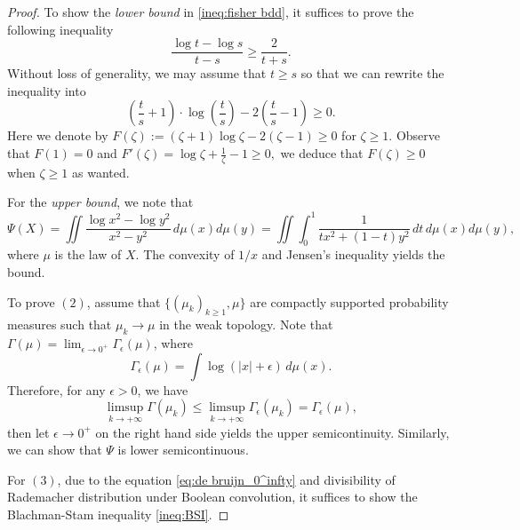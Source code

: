 \documentclass[10pt, reqno]{amsart}
\numberwithin{equation}{section}
\theoremstyle{definition}
\theoremstyle{plain}
\theoremstyle{remark}
\newcommand{\1}{\mathbbm{1}}
\begin{document}
	\begin{proof}
 To show the \emph{lower bound} in \eqref{ineq:fisher bdd}, it suffices to prove the following inequality
		\begin{equation}\label{ineq:lower bound}
			\frac{\log t-\log s}{t-s}\geq \frac{2}{t+s}.
		\end{equation}
	Without loss of generality, we may assume that $t\geq s$ so that we can rewrite the inequality into
        \begin{equation*}
			\left( \frac{t}{s}+1 \right)\cdot \log \left( \frac{t}{s} \right)- 2\left( \frac{t}{s}-1 \right)\geq 0.
		\end{equation*}
		Here we denote by $F(\zeta):=(\zeta+1)\log \zeta-2(\zeta-1)\geq 0$ for $\zeta\geq 1.$ Observe that $F(1)=0$ and $F'(\zeta)=\log \zeta+ \frac{1}{\zeta}-1\geq 0,$ we deduce that $F(\zeta)\geq 0$ when $\zeta\geq 1$ as wanted.
        
 For the \emph{upper bound}, we note that
		\begin{equation}\label{eq:fisher_0^1}
			\Psi(X) = \iint \frac{\log x^2-\log y^2}{x^2-y^2}\,d\mu(x)d\mu(y) = \iint \int_0^1 \frac{1}{tx^2 + (1-t)y^2}\,dt\,d\mu(x)d\mu(y),
		\end{equation}
        where $\mu$ is the law of $X$. 
		The convexity of $1/x$ and Jensen's inequality yields the bound.

		To prove $(2)$, assume that $\{(\mu_k)_{k\ge 1},\mu\}$ are compactly supported probability measures such that $\mu_k\to \mu$ in the weak topology. Note that $\Gamma(\mu) = \lim_{\epsilon\to 0^+}\Gamma_\epsilon(\mu)$, where
		\begin{equation*}
			\Gamma_\epsilon(\mu) = \int \log(\vert x \vert +\epsilon)\,d\mu(x).
		\end{equation*}
		Therefore, for any $\epsilon>0$, we have
		\begin{equation*}
			\limsup_{k\to +\infty}\Gamma(\mu_k) \le \limsup_{k\to +\infty} \Gamma_\epsilon(\mu_k) = \Gamma_\epsilon(\mu),
		\end{equation*}
		then let $\epsilon\to 0^+$ on the right hand side yields the upper semicontinuity. Similarly, we can show that $\Psi$ is lower semicontinuous.
        
		For $(3)$, due to the equation \eqref{eq:de bruijn_0^infty} and divisibility of Rademacher distribution under Boolean convolution, it suffices to show the Blachman-Stam inequality \eqref{ineq:BSI}.


\end{proof}
\end{document}
